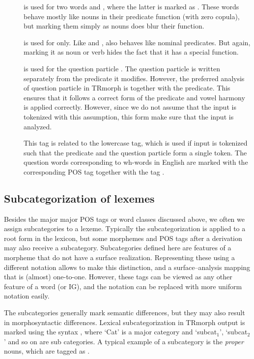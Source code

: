 \documentclass[twocolumn]{article}
\begin{document}
\begin{description}
\item[] is used for two words
 and  ,
where the latter is marked as .
These words behave mostly like nouns in their predicate function (with
zero copula), but marking them simply as nouns does blur their
function.  
\item[] is used for  only. Like 
and ,  also behaves like nominal predicates. But
again, marking it as noun or verb hides the fact that it has a special
function.
\item[] is used for the question particle . The
question particle is written separately from the predicate it
modifies. However, the preferred analysis of question particle 
in TRmorph is together with the predicate. This ensures that 
it follows a correct form of the predicate and vowel harmony is
applied correctly. However, since we do not assume that the input is
tokenized with this assumption, this form make sure that the input is
analyzed.

This tag is related to the lowercase  tag, which is used if
input is tokenized such that the predicate and the question particle
form a single token. The question words corresponding to wh-words in
English are marked with the corresponding POS tag together with the
tag .
\end{description}

\subsection{Subcategorization of lexemes}

Besides the major major POS tags or word classes discussed above, we
often we assign subcategories to a lexeme. Typically the
subcategorization is applied to a root form in the lexicon, but some
morphemes and POS tags after a derivation may also receive a
subcategory. Subcategories defined here are features of a morpheme
that do not have a surface realization. Representing these using a
different notation allows to make this distinction, and a
surface--analysis mapping that is (almost) one-to-one.  However, these
tags can be viewed as any other feature of a word (or IG), and the
notation can be replaced with more uniform notation easily.

The subcategories generally mark semantic differences, but they may
also result in morphosyntactic differences. Lexical subcategorization
in TRmorph output is marked using the syntax
, where `Cat' is a major
category and `subcat$_1$', `subcat$_2$' and so on are sub categories.
A typical example of a subcategory is the \emph{proper} nouns, which
are tagged as . 
\end{document}
